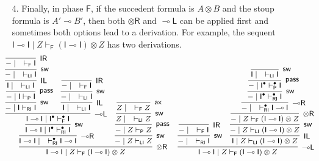 \documentclass[copyright,creativecommons]{eptcs}
\theoremstyle{definition}
\newcommand{\tr}{\otimes \mathsf{R}}
\newcommand{\lright}{{\multimap}\mathsf{R}}
\newcommand{\lleft}{{\multimap}\mathsf{L}}
\newcommand{\pass}{\mathsf{pass}}
\newcommand{\unitl}{\mathsf{IL}}
\newcommand{\unitr}{\mathsf{IR}}
\newcommand{\ax}{\mathsf{ax}}
\newcommand{\ot}{\otimes}
\newcommand{\lolli}{\multimap}
\newcommand{\I}{\mathsf{I}}
\newcommand{\RI}{\mathsf{RI}}
\newcommand{\LI}{\mathsf{LI}}
\newcommand{\Pass}{\mathsf{P}}
\newcommand{\F}{\mathsf{F}}
\begin{document}
\begin{enumerate}
\begin{equation*}
\begin{array}{cc}
{{          }
        }
  \end{array}
  \normalsize
\end{equation*}
\item[4.] Finally, in phase $\F$, if the succedent formula is $A \ot B$ and the stoup formula is $A' \lolli B'$, then both $\tr$ and $\lleft$ can be applied first and sometimes both options lead to a derivation. For example, the sequent
$\I \lolli \I \mid Z \vdash_{\F} (\I \lolli \I) \ot Z$ has two derivations.
\begin{equation*}
\hspace*{-5mm}
\small
  \begin{array}{cc}
    \infer[\tr]{\I \lolli \I \mid Z \vdash_{\F} (\I \lolli \I) \ot Z}{
      \infer[\lright]{\I \lolli \I \mid \quad \vdash^{\bullet}_{\RI} \I \lolli \I}{
        \infer[\mathsf{sw}]{\I \lolli \I \mid \I^{\bullet} \vdash^{\bullet}_{\RI} \I}{
          \infer[\lleft]{\I \lolli \I \mid \I^{\bullet} \vdash^{\bullet}_{\F} \I}{
            \infer[\mathsf{sw}]{{-} \mid \I \vdash_{\RI} \I}{
              \infer[\pass]{{-} \mid \I \vdash_{\Pass} \I}{
                \infer[\unitl]{\I \mid \quad \vdash_{\LI} \I}{
                  \infer[\mathsf{sw}]{{-} \mid \quad \vdash_{\LI} \I}{
                    \infer[\unitr]{{-} \mid \quad \vdash_{\F} \I}{}
                  }
                }
              }
            }
            &
            \infer[\unitl]{\I \mid \quad \vdash_{\LI} \I}{
              \infer[\mathsf{sw}]{{-} \mid \quad \vdash_{\LI} \I}{
                \infer[\unitr]{{-} \mid \quad \vdash_{\F} \I}{}
              }
            }
          }
        }
      }
      &
      \infer[\mathsf{sw}]{{-} \mid Z \vdash_{\LI} Z}{
        \infer[\pass]{{-} \mid Z \vdash_{\Pass} Z}{
          \infer[\mathsf{sw}]{Z \mid \quad \vdash_{\LI} Z}{
            \infer[\ax]{Z \mid \quad \vdash_{\F} Z}{}
          }
        }
      }
    }
    &
    \infer[\lleft]{\I \lolli \I \mid Z \vdash_{\F} (\I \lolli \I) \ot Z}{
      \infer[\mathsf{sw}]{{-} \mid \quad \vdash_{\RI} \I}{
        \infer[\unitr]{{-} \mid \quad \vdash_{\F} \I}{}
      }
      &
      \infer[\unitl]{\I \mid Z \vdash_{\LI} (\I \lolli \I) \ot Z}{
        \infer[\mathsf{sw}]{{-} \mid Z \vdash_{\LI} (\I \lolli \I) \ot Z}{
          \infer[\tr]{{-} \mid Z \vdash_{\F} (\I \lolli \I) \ot Z}{
            \infer[\lright]{{-} \mid \quad \vdash^{\bullet}_{\RI} \I \lolli \I}{
              \infer[\mathsf{sw}]{{-} \mid \I^{\bullet} \vdash^{\bullet}_{\RI} \I}{
                \infer[\pass]{{-} \mid \I^{\bullet} \vdash^{\bullet}_{\Pass} \I}{
                  \infer[\mathsf{sw}]{\I \mid \quad \vdash_{\LI} \I}{
}}}}}}}}
\end{array}
\end{equation*}
\end{enumerate}
\end{document}
